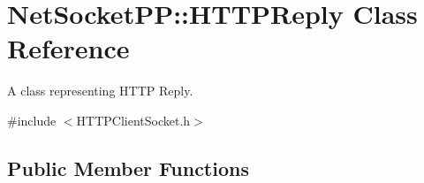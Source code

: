 \hypertarget{class_net_socket_p_p_1_1_h_t_t_p_reply}{\section{Net\-Socket\-P\-P\-:\-:H\-T\-T\-P\-Reply Class Reference}
\label{class_net_socket_p_p_1_1_h_t_t_p_reply}
}


A class representing H\-T\-T\-P Reply.  




{\ttfamily \#include $<$H\-T\-T\-P\-Client\-Socket.\-h$>$}

\subsection*{Public Member Functions}
